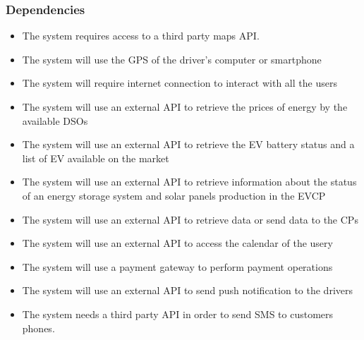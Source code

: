 \subsubsection*{Dependencies}
\begin{itemize}
      \item The system requires access to a third party maps API.
      \item The system will use the GPS of the driver's computer or smartphone
      \item The system will require internet connection to interact with all the users
      \item The system will use an external API to retrieve the prices of energy by the available DSOs
      \item The system will use an external API to retrieve the EV battery status and a list of EV available on the market
      \item The system will use an external API to retrieve information about the status of an energy storage system and solar panels production in the EVCP
      \item The system will use an external API to retrieve data or send data to the CPs
      \item The system will use an external API to access the calendar of the usery
      \item The system will use a payment gateway to perform payment operations
      \item The system will use an external API to send push notification to the drivers
      \item The system needs a third party API in order to send SMS to customers phones.
\end{itemize}
